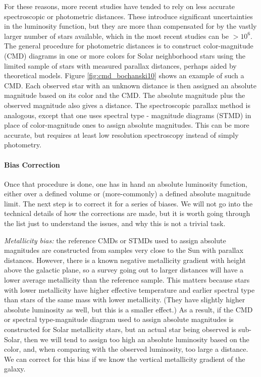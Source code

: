 For these reasons, more recent studies have tended to rely on less accurate spectroscopic or photometric distances. These introduce significant uncertainties in the luminosity function, but they are more than compensated for by the vastly larger number of stars available, which in the most recent studies can be $>10^6$. The general procedure for photometric distances is to construct color-magnitude (CMD) diagrams in one or more colors for Solar neighborhood stars using the limited sample of stars with measured parallax distances, perhaps aided by theoretical models. Figure \ref{fig:cmd_bochanski10} shows an example of such a CMD. Each observed star with an unknown distance is then assigned an absolute magnitude based on its color and the CMD. The absolute magnitude plus the observed magnitude also gives a distance. The spectroscopic parallax method is analogous, except that one uses spectral type - magnitude diagrams (STMD) in place of color-magnitude ones to assign absolute magnitudes. This can be more accurate, but requires at least low resolution spectroscopy instead of simply photometry.

\paragraph{Bias Correction}

Once that procedure is done, one has in hand an absolute luminosity function, either over a defined volume or (more-commonly) a defined absolute magnitude limit. The next step is to correct it for a series of biases. We will not go into the technical details of how the corrections are made, but it is worth going through the list just to understand the issues, and why this is not a trivial task.

\textit{Metallicity bias:} the reference CMDs or STMDs used to assign absolute magnitudes are constructed from samples very close to the Sun with parallax distances. However, there is a known negative metallicity gradient with height above the galactic plane, so a survey going out to larger distances will have a lower average metallicity than the reference sample. This matters because stars with lower metallicity have higher effective temperature and earlier spectral type than stars of the same mass with lower metallicity. (They have slightly higher absolute luminosity as well, but this is a smaller effect.) As a result, if the CMD or spectral type-magnitude diagram used to assign absolute magnitudes is constructed for Solar metallicity stars, but an actual star being observed is sub-Solar, then we will tend to assign too high an absolute luminosity based on the color, and, when comparing with the observed luminosity, too large a distance. We can correct for this bias if we know the vertical metallicity gradient of the galaxy.

